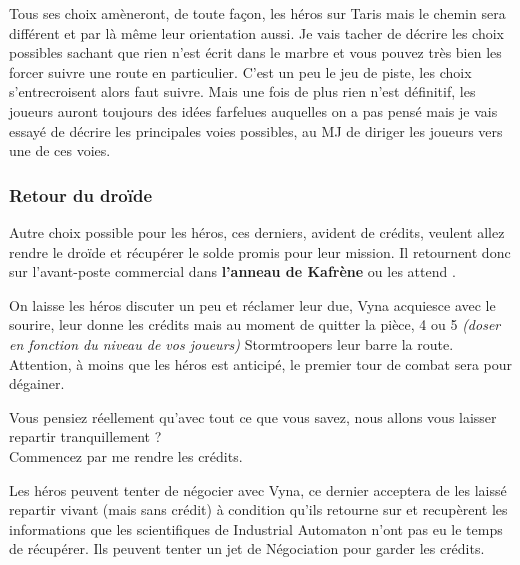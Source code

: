 Tous ses choix amèneront, de toute façon, les héros sur Taris mais le chemin sera différent et par là même leur orientation aussi. Je vais tacher de décrire les choix possibles sachant que rien n’est écrit dans le marbre et vous pouvez très bien les forcer suivre une route en particulier. C'est un peu le jeu de piste, les choix s'entrecroisent alors faut suivre. Mais une fois de plus rien n'est définitif, les joueurs auront toujours des idées farfelues auquelles on a pas pensé mais je vais essayé de décrire les principales voies possibles, au MJ de diriger les joueurs vers une de ces voies.


\subsubsection{Retour du droïde} \label{sec:retour-du-droide}

Autre choix possible pour les héros, ces derniers, avident de crédits, veulent allez rendre le droïde et récupérer le solde promis pour leur mission. Il retournent donc sur l'avant-poste commercial dans \textbf{l'anneau de Kafrène} ou les attend .

On laisse les héros discuter un peu et réclamer leur due, Vyna acquiesce avec le sourire, leur donne les crédits mais au moment de quitter la pièce, 4 ou 5 \textit{(doser en fonction du niveau de vos joueurs)} Stormtroopers leur barre la route. Attention, à moins que les héros est anticipé, le premier tour de combat sera pour dégainer.

\begin{quotebox}
    Vous pensiez réellement qu'avec tout ce que vous savez, nous allons vous laisser repartir tranquillement ?\\
    Commencez par me rendre les crédits.
\end{quotebox}

Les héros peuvent tenter de négocier avec Vyna, ce dernier acceptera de les laissé repartir vivant (mais sans crédit) à condition qu'ils retourne sur  et recupèrent les informations que les scientifiques de Industrial Automaton n'ont pas eu le temps de récupérer. Ils peuvent tenter un jet de Négociation pour garder les crédits.\\

